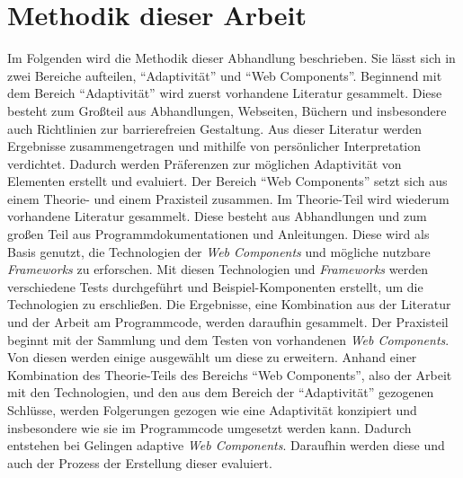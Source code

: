\documentclass[12pt, paper=a4, bibtotoc, toc=listof, headsepline=true]{scrreprt}
\begin{document}
\chapter{Methodik dieser Arbeit}
Im Folgenden wird die Methodik dieser Abhandlung beschrieben. Sie lässt sich in zwei Bereiche aufteilen, \enquote{Adaptivität} und \enquote{Web Components}.
Beginnend mit dem Bereich \enquote{Adaptivität} wird zuerst vorhandene Literatur gesammelt. Diese besteht zum Großteil aus Abhandlungen, Webseiten, Büchern und insbesondere auch Richtlinien zur barrierefreien Gestaltung. Aus dieser Literatur werden Ergebnisse zusammengetragen und mithilfe von persönlicher Interpretation verdichtet. Dadurch werden Präferenzen zur möglichen Adaptivität von Elementen erstellt und evaluiert.
\newline
Der Bereich \enquote{Web Components} setzt sich aus einem Theorie- und einem Praxisteil zusammen. Im Theorie-Teil wird wiederum vorhandene Literatur gesammelt. Diese besteht aus Abhandlungen und zum großen Teil aus Programmdokumentationen und Anleitungen. Diese wird als Basis genutzt, die Technologien der \emph{Web Components} und mögliche nutzbare \emph{Frameworks} zu erforschen. Mit diesen Technologien und \emph{Frameworks} werden verschiedene Tests durchgeführt und Beispiel-Komponenten erstellt, um die Technologien zu erschließen. Die Ergebnisse, eine Kombination aus der Literatur und der Arbeit am Programmcode, werden daraufhin gesammelt. Der Praxisteil beginnt mit der Sammlung und dem Testen von vorhandenen \emph{Web Components}. Von diesen werden einige ausgewählt um diese zu erweitern. Anhand einer Kombination des Theorie-Teils des Bereichs \enquote{Web Components}, also der Arbeit mit den Technologien, und den aus dem Bereich der \enquote{Adaptivität} gezogenen Schlüsse, werden Folgerungen gezogen wie eine Adaptivität konzipiert und insbesondere wie sie im Programmcode umgesetzt werden kann. Dadurch entstehen bei Gelingen adaptive \emph{Web Components}. Daraufhin werden diese und auch der Prozess der Erstellung dieser evaluiert.
\end{document}
